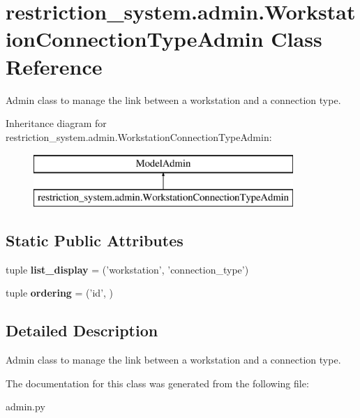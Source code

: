 \hypertarget{classrestriction__system_1_1admin_1_1WorkstationConnectionTypeAdmin}{}\section{restriction\+\_\+system.\+admin.\+Workstation\+Connection\+Type\+Admin Class Reference}
\label{classrestriction__system_1_1admin_1_1WorkstationConnectionTypeAdmin}


Admin class to manage the link between a workstation and a connection type.  


Inheritance diagram for restriction\+\_\+system.\+admin.\+Workstation\+Connection\+Type\+Admin\+:\begin{figure}[H]
\begin{center}
\leavevmode
\includegraphics[height=2.000000cm]{classrestriction__system_1_1admin_1_1WorkstationConnectionTypeAdmin}
\end{center}
\end{figure}
\subsection*{Static Public Attributes}
\begin{DoxyCompactItemize}
\item 
\hypertarget{classrestriction__system_1_1admin_1_1WorkstationConnectionTypeAdmin_a134d805984a2950f12eb061fa7783001}{}tuple {\bfseries list\+\_\+display} = ('workstation', 'connection\+\_\+type')\label{classrestriction__system_1_1admin_1_1WorkstationConnectionTypeAdmin_a134d805984a2950f12eb061fa7783001}

\item 
\hypertarget{classrestriction__system_1_1admin_1_1WorkstationConnectionTypeAdmin_a6e2c22260a3289cc19c7161b95c65c74}{}tuple {\bfseries ordering} = ('id', )\label{classrestriction__system_1_1admin_1_1WorkstationConnectionTypeAdmin_a6e2c22260a3289cc19c7161b95c65c74}

\end{DoxyCompactItemize}


\subsection{Detailed Description}
Admin class to manage the link between a workstation and a connection type. 

The documentation for this class was generated from the following file\+:\begin{DoxyCompactItemize}
\item 
admin.\+py\end{DoxyCompactItemize}
